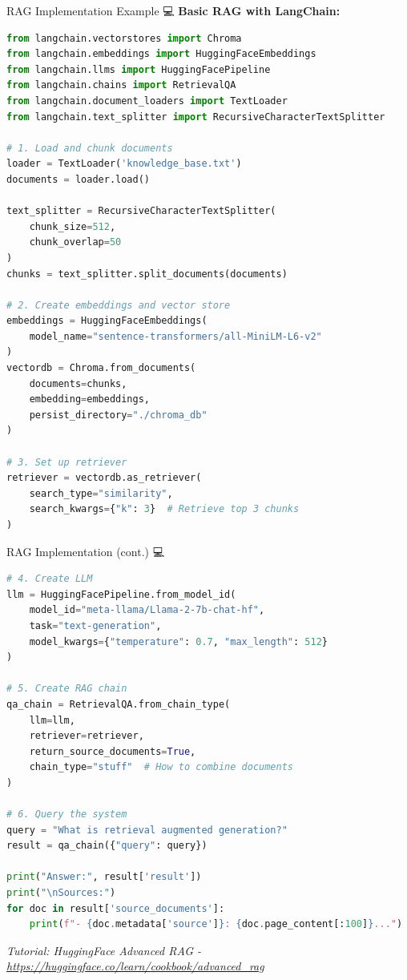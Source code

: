 \documentclass[aspectratio=169]{beamer}
\begin{document}
\begin{frame}[fragile]{RAG Implementation Example 💻}
\textbf{Basic RAG with LangChain:}

\begin{lstlisting}[language=Python]
from langchain.vectorstores import Chroma
from langchain.embeddings import HuggingFaceEmbeddings
from langchain.llms import HuggingFacePipeline
from langchain.chains import RetrievalQA
from langchain.document_loaders import TextLoader
from langchain.text_splitter import RecursiveCharacterTextSplitter

# 1. Load and chunk documents
loader = TextLoader('knowledge_base.txt')
documents = loader.load()

text_splitter = RecursiveCharacterTextSplitter(
    chunk_size=512,
    chunk_overlap=50
)
chunks = text_splitter.split_documents(documents)

# 2. Create embeddings and vector store
embeddings = HuggingFaceEmbeddings(
    model_name="sentence-transformers/all-MiniLM-L6-v2"
)
vectordb = Chroma.from_documents(
    documents=chunks,
    embedding=embeddings,
    persist_directory="./chroma_db"
)

# 3. Set up retriever
retriever = vectordb.as_retriever(
    search_type="similarity",
    search_kwargs={"k": 3}  # Retrieve top 3 chunks
)
\end{lstlisting}
\end{frame}

\begin{frame}[fragile]{RAG Implementation (cont.) 💻}
\begin{lstlisting}[language=Python]
# 4. Create LLM
llm = HuggingFacePipeline.from_model_id(
    model_id="meta-llama/Llama-2-7b-chat-hf",
    task="text-generation",
    model_kwargs={"temperature": 0.7, "max_length": 512}
)

# 5. Create RAG chain
qa_chain = RetrievalQA.from_chain_type(
    llm=llm,
    retriever=retriever,
    return_source_documents=True,
    chain_type="stuff"  # How to combine documents
)

# 6. Query the system
query = "What is retrieval augmented generation?"
result = qa_chain({"query": query})

print("Answer:", result['result'])
print("\nSources:")
for doc in result['source_documents']:
    print(f"- {doc.metadata['source']}: {doc.page_content[:100]}...")
\end{lstlisting}

\vspace{0.3em}
\small
\textit{Tutorial: HuggingFace Advanced RAG - \url{https://huggingface.co/learn/cookbook/advanced_rag}}
\end{frame}
\end{document}
